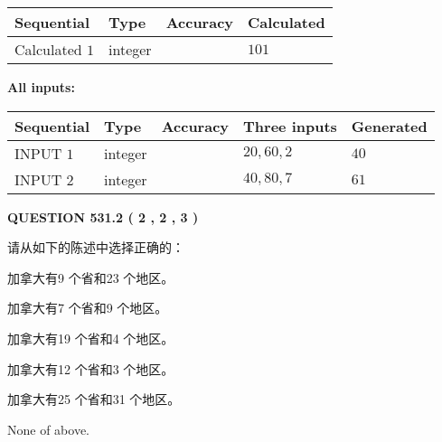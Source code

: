 \documentclass{ctexart}
\begin{document}
   
   
   
\noindent{}
   
   
  
  
\noindent\begin{tabular}{|l|l|l|l|}
\hline
 Sequential & Type & Accuracy & Calculated \\ 
\hline
 
 
  Calculated $  1 $ & integer &  & 
  $ 101 $ 
 \\  \hline  
 \end{tabular}
   
   
   
   
\noindent\vspace{0.1in}\hspace{-0.08in} {\textbf{\Large{All inputs: }}}
   
   
  
  
\noindent\begin{tabular}{|l|l|l|l|l|}
\hline
 Sequential & Type & Accuracy & Three inputs & Generated \\ 
\hline
 
 
  INPUT $  1 $ & integer &  & $
 20
 , 
 60
 , 
 2
 $ & $ 40 $ 
 \\  \hline  
 
 
  INPUT $  2 $ & integer &  & $
 40
 , 
 80
 , 
 7
 $ & $ 61 $ 
 \\  \hline  
 \end{tabular}
   
   
  
\vspace{0.2in}
  
{\textbf{\Large{QUESTION
531.2 
 ( 2 , 2 , 3 )
}}}
  
  
请从如下的陈述中选择正确的：
 
 
加拿大有9 个省和23 个地区。
 
 
加拿大有7 个省和9 个地区。
 
 
加拿大有19 个省和4 个地区。
 
 
加拿大有12 个省和3 个地区。
 
 
加拿大有25 个省和31 个地区。
 
 
 None of above.
 
 
\noindent{}
 
\end{document}
